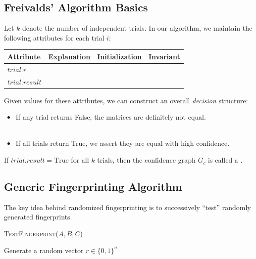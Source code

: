 \documentclass[11pt]{exam}
\begin{document}
	\newpage
	\subsection{Freivalds' Algorithm Basics}
	Let $k$ denote the number of independent trials. In our algorithm, we maintain the following attributes for each trial $i$: \\
	
	
	\begin{tabular}{| l | p{4.5cm} | p{4.5cm} | p{4.5cm} |}
		\hline
		\textbf{Attribute} & \textbf{Explanation} & \textbf{Initialization} & \textbf{Invariant} \\
		\hline
		$trial.r$ & \phantom{the random vector chosen for this iteration} \newline &  \phantom{$r \sim \{0,1\}^n$;} \newline \phantom{randomize} & \phantom{We will always maintain:  $r_j \in \{0,1\}$} \\
		\hline
		$trial.result$ \newline &  \phantom{whether the fingerprint matched} \newline \phantom{whether the fingerprint matched} &  & \\
		\hline
	\end{tabular}
	
	\vs{2cm}
	
	Given values for these attributes, we can construct an overall \emph{decision} structure:
	\begin{itemize}
		\item If any trial returns False, the matrices are definitely not equal. \\\
		\item If all trials return True, we assert they are equal with high confidence.
	\end{itemize}
	
	
	If $trial.result = \text{True}$ for all $k$ trials, then the confidence graph $G_c$ is called a .
	
	\vs{3cm}
	
	
	
	\newpage
	
	\subsection{Generic Fingerprinting Algorithm}
	The key idea behind randomized fingerprinting is to successively ``test'' randomly generated fingerprints.
	\begin{algorithm}
		\textsc{TestFingerprint}($A,B,C$)
		\begin{algorithmic}
			\State Generate a random vector $r \in \{0,1\}^n$
			\State 
			\State
			\State
			\State
			\EndIf
		\end{algorithmic}
	\end{algorithm}
	
\end{document}
